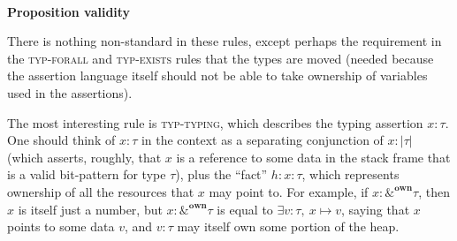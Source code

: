 \documentclass[acmsmall,nonacm]{acmart}
\newcommand*{\N}{\mathbb{N}}
\newcommand{\wand}{\mathrel{-\!\!\ast}}
\newcommand{\core}[1]{\left| #1 \right|}
\newcommand{\proves}{\vdash}
\newcommand{\judgment}[2][]{\noindent\\\textbf{#1}\hspace{\stretch{1}}\fbox{$#2$}\nopagebreak}
\newcommand*{\axiom}[2][]{\infer[#1]{}{#2}}
\begin{document}
\judgment[Proposition validity]{\Gamma \proves A\;\mathsf{prop}}

There is nothing non-standard in these rules, except perhaps the requirement in the \textsc{typ-forall} and \textsc{typ-exists} rules that the types are moved (needed because the assertion language itself should not be able to take ownership of variables used in the assertions).

The most interesting rule is \textsc{typ-typing}, which describes the typing assertion $\boxed{x:\tau}$. One should think of $x:\tau$ in the context as a separating conjunction of $x:\core\tau$ (which asserts, roughly, that $x$ is a reference to some data in the stack frame that is a valid bit-pattern for type $\tau$), plus the ``fact'' $h:\boxed{x:\tau}$, which represents ownership of all the resources that $x$ may point to. For example, if $x:\&^\mathbf{own}\tau$, then $x$ is itself just a number, but $\boxed{x:\&^\mathbf{own}\tau}$ is equal to $\exists v:\tau,\ x\mapsto v$, saying that $x$ points to some data $v$, and $v:\tau$ may itself own some portion of the heap.
\end{document}
